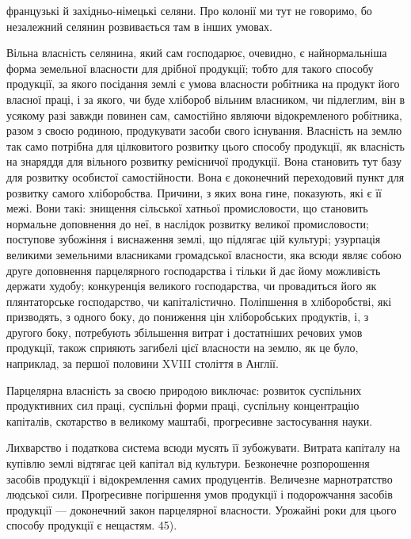 французькі й західньо-німецькі селяни. Про колонії ми тут не говоримо, бо
незалежний селянин розвивається там в інших умовах.

Вільна власність селянина, який сам господарює, очевидно, є найнормальніша
форма земельної власности для дрібної продукції; тобто для такого способу
продукції, за якого посідання землі є умова власности робітника на продукт
його власної праці, і за якого, чи буде хлібороб вільним власником, чи підлеглим,
він в усякому разі завжди повинен сам, самостійно являючи відокремленого
робітника, разом з своєю родиною, продукувати засоби свого існування. Власність
на землю так само потрібна для цілковитого розвитку цього способу продукції,
як власність на знаряддя для вільного розвитку ремісничої продукції. Вона
становить тут базу для розвитку особистої самостійности. Вона є доконечний
переходовий пункт для розвитку самого хліборобства. Причини, з яких вона
гине, показують, які є її межі. Вони такі: знищення сільської хатньої промисловости,
що становить нормальне доповнення до неї, в наслідок розвитку
великої промисловости; поступове зубожіння і виснаження землі, що підлягає
цій культурі; узурпація великими земельними власниками громадської власности,
яка всюди являє собою друге доповнення парцелярного господарства і
тільки й дає йому можливість держати худобу; конкуренція великого господарства,
чи провадиться його як плянтаторське господарство, чи капіталістично.
Поліпшення в хліборобстві, які призводять, з одного боку, до пониження цін
хліборобських продуктів, і, з другого боку, потребують збільшення витрат і
достатніших речових умов продукції, також сприяють загибелі цієї власности
на землю, як це було, наприклад, за першої половини XVIII століття в Англії.

Парцелярна власність за своєю природою виключає: розвиток суспільних
продуктивних сил праці, суспільні форми праці, суспільну концентрацію капіталів,
скотарство в великому маштабі, прогресивне застосування науки.

Лихварство і податкова система всюди мусять її зубожувати. Витрата капіталу
на купівлю землі відтягає цей капітал від культури. Безконечне розпорошення
засобів продукції і відокремлення самих продуцентів. Величезне марнотратство
людської сили. Проґресивне погіршення умов продукції і подорожчання
засобів продукції — доконечний закон парцелярної власности. Урожайні роки для
цього способу продукції є нещастям. 45).

